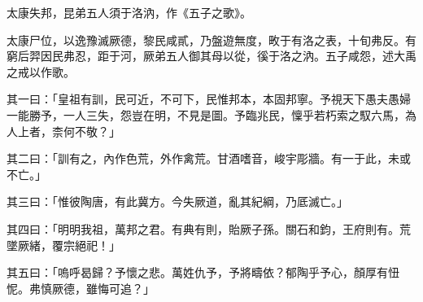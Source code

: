 
\begin{pinyinscope}
太康失邦，昆弟五人須于洛汭，作《五子之歌》。

太康尸位，以逸豫滅厥德，黎民咸貳，乃盤遊無度，畋于有洛之表，十旬弗反。有窮后羿因民弗忍，距于河，厥弟五人御其母以從，徯于洛之汭。五子咸怨，述大禹之戒以作歌。

其一曰：「皇祖有訓，民可近，不可下，民惟邦本，本固邦寧。予視天下愚夫愚婦一能勝予，一人三失，怨豈在明，不見是圖。予臨兆民，懍乎若朽索之馭六馬，為人上者，柰何不敬？」

其二曰：「訓有之，內作色荒，外作禽荒。甘酒嗜音，峻宇彫牆。有一于此，未或不亡。」

其三曰：「惟彼陶唐，有此冀方。今失厥道，亂其紀綱，乃厎滅亡。」

其四曰：「明明我祖，萬邦之君。有典有則，貽厥子孫。關石和鈞，王府則有。荒墜厥緒，覆宗絕祀！」

其五曰：「嗚呼曷歸？予懷之悲。萬姓仇予，予將疇依？郁陶乎予心，顏厚有忸怩。弗慎厥德，雖悔可追？」


\end{pinyinscope}